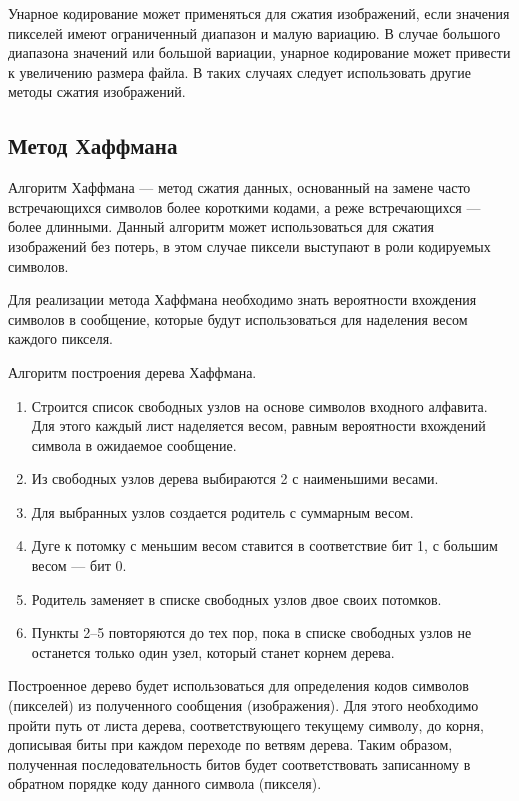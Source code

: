Унарное кодирование может применяться для сжатия изображений, если значения пикселей имеют ограниченный диапазон и малую вариацию. В случае большого диапазона значений или большой вариации, унарное кодирование может привести к увеличению размера файла. В таких случаях следует использовать другие методы сжатия изображений.

\subsection{Метод Хаффмана}

Алгоритм Хаффмана --- метод сжатия данных, основанный на замене часто встречающихся символов более короткими кодами, а реже встречающихся --- более длинными. Данный алгоритм может использоваться для сжатия изображений без потерь, в этом случае пиксели выступают в роли кодируемых символов.

Для реализации метода Хаффмана необходимо знать вероятности вхождения символов в сообщение, которые будут использоваться для наделения весом каждого пикселя.

Алгоритм построения дерева Хаффмана.
\begin{enumerate}
    \item Строится список свободных узлов на основе символов входного алфавита. Для этого каждый лист наделяется весом, равным вероятности вхождений символа в ожидаемое сообщение.
    \item Из свободных узлов дерева выбираются 2 с наименьшими весами.
    \item Для выбранных узлов создается родитель с суммарным весом.
    \item Дуге к потомку с меньшим весом ставится в соответствие бит 1, с большим весом --- бит 0.
    \item Родитель заменяет в списке свободных узлов двое своих потомков.
    \item Пункты 2--5 повторяются до тех пор, пока в списке свободных узлов не останется только один узел, который станет корнем дерева.
\end{enumerate}

Построенное дерево будет использоваться для определения кодов символов (пикселей) из полученного сообщения (изображения).
Для этого необходимо пройти путь от листа дерева, соответствующего текущему символу, до корня, дописывая биты при каждом переходе по ветвям дерева. Таким образом, полученная последовательность битов будет соответствовать записанному в обратном порядке коду данного символа (пикселя).

